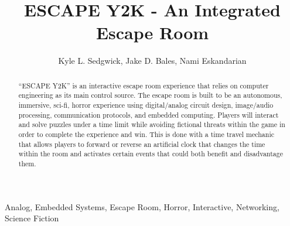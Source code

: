 \documentclass[conference]{IEEEtran}
\begin{document}
\title{ESCAPE Y2K - An Integrated Escape Room}

\author{Kyle L. Sedgwick, Jake D. Bales, Nami Eskandarian}

\author{
    \and
    \and
}



\maketitle

\begin{abstract}
    “ESCAPE Y2K” is an interactive escape room experience that relies on computer
    engineering as its main control source. The escape room is built to be an autonomous,
    immersive, sci-fi, horror experience using digital/analog circuit design, image/audio
    processing, communication protocols, and embedded computing. Players
    will interact and solve puzzles under a time limit while avoiding fictional threats within
    the game in order to complete the experience and win. This is done with a time travel mechanic
    that allows players to forward or reverse an artificial clock that changes the time within
    the room and activates certain events that could both benefit and disadvantage them.
\end{abstract}

\begin{IEEEkeywords}
    Analog, Embedded Systems, Escape Room, Horror, Interactive, Networking, Science Fiction
\end{IEEEkeywords}
\end{document}
